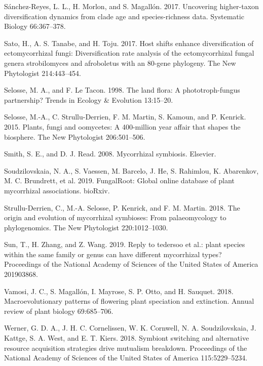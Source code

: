 \documentclass[
  12pt,
]{article}
\newenvironment{cslreferences}%
  {}%
  {\par}
\begin{document}
\begin{cslreferences}
\leavevmode\hypertarget{ref-snchezreyes_2017}{}%
Sánchez-Reyes, L. L., H. Morlon, and S. Magallón. 2017. Uncovering
higher-taxon diversification dynamics from clade age and
species-richness data. Systematic Biology 66:367--378.

\leavevmode\hypertarget{ref-sato_2017}{}%
Sato, H., A. S. Tanabe, and H. Toju. 2017. Host shifts enhance
diversification of ectomycorrhizal fungi: Diversification rate analysis
of the ectomycorrhizal fungal genera strobilomyces and afroboletus with
an 80-gene phylogeny. The New Phytologist 214:443--454.

\leavevmode\hypertarget{ref-selosse_1998}{}%
Selosse, M. A., and F. Le Tacon. 1998. The land flora: A
phototroph-fungus partnership? Trends in Ecology \& Evolution 13:15--20.

\leavevmode\hypertarget{ref-selosse_2015}{}%
Selosse, M.-A., C. Strullu-Derrien, F. M. Martin, S. Kamoun, and P.
Kenrick. 2015. Plants, fungi and oomycetes: A 400-million year affair
that shapes the biosphere. The New Phytologist 206:501--506.

\leavevmode\hypertarget{ref-smith_2008}{}%
Smith, S. E., and D. J. Read. 2008. Mycorrhizal symbiosis. Elsevier.

\leavevmode\hypertarget{ref-soudzilovskaia_2019}{}%
Soudzilovskaia, N. A., S. Vaessen, M. Barcelo, J. He, S. Rahimlou, K.
Abarenkov, M. C. Brundrett, et al. 2019. FungalRoot: Global online
database of plant mycorrhizal associations. bioRxiv.

\leavevmode\hypertarget{ref-strulluderrien_2018}{}%
Strullu-Derrien, C., M.-A. Selosse, P. Kenrick, and F. M. Martin. 2018.
The origin and evolution of mycorrhizal symbioses: From palaeomycology
to phylogenomics. The New Phytologist 220:1012--1030.

\leavevmode\hypertarget{ref-sun_2019}{}%
Sun, T., H. Zhang, and Z. Wang. 2019. Reply to tedersoo et al.: plant
species within the same family or genus can have different mycorrhizal
types? Proceedings of the National Academy of Sciences of the United
States of America 201903868.

\leavevmode\hypertarget{ref-vamosi_2018}{}%
Vamosi, J. C., S. Magallón, I. Mayrose, S. P. Otto, and H. Sauquet.
2018. Macroevolutionary patterns of flowering plant speciation and
extinction. Annual review of plant biology 69:685--706.

\leavevmode\hypertarget{ref-werner_2018}{}%
Werner, G. D. A., J. H. C. Cornelissen, W. K. Cornwell, N. A.
Soudzilovskaia, J. Kattge, S. A. West, and E. T. Kiers. 2018. Symbiont
switching and alternative resource acquisition strategies drive
mutualism breakdown. Proceedings of the National Academy of Sciences of
the United States of America 115:5229--5234.


\end{cslreferences}
\end{document}
